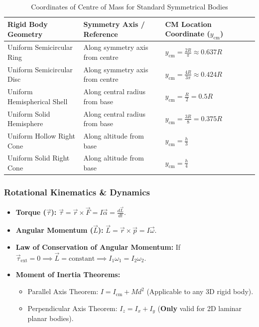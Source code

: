 \documentclass[11pt,a4paper]{article}
\begin{document}
\begin{table}[h]
\centering
\small
\begin{tabularx}{\textwidth}{l X l}
\toprule
\textbf{Rigid Body Geometry} & \textbf{Symmetry Axis / Reference} & \textbf{CM Location Coordinate ($y_{\text{cm}}$)} \\
\midrule
Uniform Semicircular Ring & Along symmetry axis from centre & $y_{\text{cm}} = \frac{2R}{\pi} \approx 0.637 R$ \\
Uniform Semicircular Disc & Along symmetry axis from centre & $y_{\text{cm}} = \frac{4R}{3\pi} \approx 0.424 R$ \\
Uniform Hemispherical Shell & Along central radius from base & $y_{\text{cm}} = \frac{R}{2} = 0.5 R$ \\
Uniform Solid Hemisphere & Along central radius from base & $y_{\text{cm}} = \frac{3R}{8} = 0.375 R$ \\
Uniform Hollow Right Cone & Along altitude from base & $y_{\text{cm}} = \frac{h}{3}$ \\
Uniform Solid Right Cone & Along altitude from base & $y_{\text{cm}} = \frac{h}{4}$ \\
\bottomrule
\end{tabularx}
\caption{Coordinates of Centre of Mass for Standard Symmetrical Bodies}
\end{table}

\subsubsection{Rotational Kinematics \& Dynamics}
\begin{itemize}[leftmargin=1.5em, itemsep=2pt]
  \item \textbf{Torque ($\vec{\tau}$):} $\vec{\tau} = \vec{r} \times \vec{F} = I \vec{\alpha} = \frac{d\vec{L}}{dt}$.
  \item \textbf{Angular Momentum ($\vec{L}$):} $\vec{L} = \vec{r} \times \vec{p} = I \vec{\omega}$.
  \item \textbf{Law of Conservation of Angular Momentum:} If $\vec{\tau}_{\text{ext}} = 0 \implies \vec{L} = \text{constant} \implies I_1 \omega_1 = I_2 \omega_2$.
  \item \textbf{Moment of Inertia Theorems:}
  \begin{itemize}[label=$\circ$]
    \item Parallel Axis Theorem: $I = I_{\text{cm}} + M d^2$ (Applicable to any 3D rigid body).
    \item Perpendicular Axis Theorem: $I_z = I_x + I_y$ (\textbf{Only} valid for 2D laminar planar bodies).
  \end{itemize}
\end{itemize}
\end{document}
